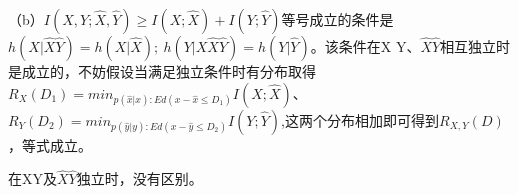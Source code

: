 \documentclass[UTF8]{ctexart}
\begin{document}
（b）$I(X,Y;\hat{X},\hat{Y})\geqslant I(X;\hat{X})+I(Y;\hat{Y})$等号成立的条件是$h(X|\hat{X}\hat{Y}) =  h(X|\hat{X});\ h(Y|X\hat{X}\hat{Y})=h(Y|\hat{Y})$。该条件在X Y、$\hat{X} \hat{Y}$相互独立时是成立的，不妨假设当满足独立条件时有分布取得$R_X(D_1)=min_{p(\hat{x}|x):Ed(x-\hat{x}\leqslant D_1)}I(X;\hat{X})$、$R_Y(D_2)=min_{p(\hat{y}|y):Ed(x-\hat{y}\leqslant D_2)}I(Y;\hat{Y})$,这两个分布相加即可得到$R_{X,Y}(D)$，等式成立。

在XY及$\hat{X}\hat{Y}$独立时，没有区别。
\end{document}

